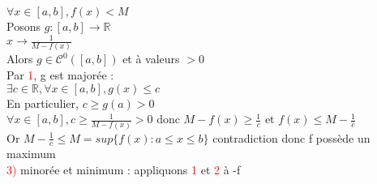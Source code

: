 \documentclass{article}
\begin{document}
$\forall x \in [a,b], f(x)<M$ \\ 
Posons $g: [a,b] \rightarrow \mathbb{R}$ \\ 
$x \rightarrow \frac{1}{M-f(x)}$ \\ 
Alors $g \in \mathcal{C}^0([a,b])$ et à valeurs $> 0$ \\ 
Par \textcolor{red}{1}, g est majorée : \\ 
$\exists c \in \mathbb{R}, \forall x \in [a,b],g(x) \leq c$ \\ 
En particulier, $c \geq g(a) >0$ \\ 
$\forall x \in [a,b], c \geq \frac{1}{M-f(x)}>0$ donc $M-f(x) \geq \frac{1}{c}$ et $f(x) \leq M- \frac{1}{c}$ \\ 
Or $M-\frac{1}{c} \leq M=sup \lbrace f(x): a\leq x \leq b \rbrace$ contradiction donc f possède un maximum \\
\textcolor{red}{3)} minorée et minimum :  appliquons \textcolor{red}{1} et \textcolor{red}{2} à -f
\end{document}
